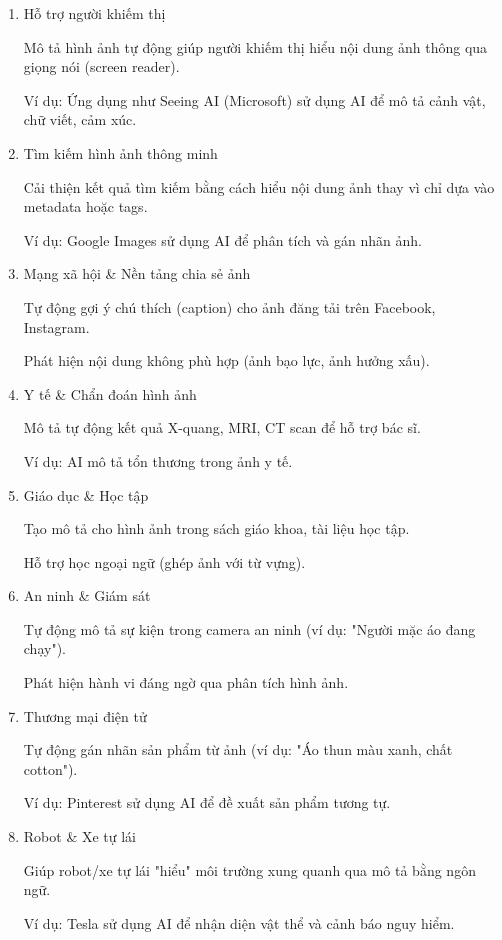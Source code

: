 \documentclass[../main.tex]{subfiles}
\begin{document}
\begin{enumerate}
    \item Hỗ trợ người khiếm thị
    
    Mô tả hình ảnh tự động giúp người khiếm thị hiểu nội dung ảnh thông qua giọng nói (screen reader).

    Ví dụ: Ứng dụng như Seeing AI (Microsoft) sử dụng AI để mô tả cảnh vật, chữ viết, cảm xúc.

    \item Tìm kiếm hình ảnh thông minh
    
    Cải thiện kết quả tìm kiếm bằng cách hiểu nội dung ảnh thay vì chỉ dựa vào metadata hoặc tags.

    Ví dụ: Google Images sử dụng AI để phân tích và gán nhãn ảnh.

    \item Mạng xã hội \& Nền tảng chia sẻ ảnh
    
    Tự động gợi ý chú thích (caption) cho ảnh đăng tải trên Facebook, Instagram.

    Phát hiện nội dung không phù hợp (ảnh bạo lực, ảnh hưởng xấu).

    \item Y tế \& Chẩn đoán hình ảnh
    
    Mô tả tự động kết quả X-quang, MRI, CT scan để hỗ trợ bác sĩ.

    Ví dụ: AI mô tả tổn thương trong ảnh y tế.

    \item Giáo dục \& Học tập
    
    Tạo mô tả cho hình ảnh trong sách giáo khoa, tài liệu học tập.

    Hỗ trợ học ngoại ngữ (ghép ảnh với từ vựng).

    \item An ninh \& Giám sát
    
    Tự động mô tả sự kiện trong camera an ninh (ví dụ: "Người mặc áo đang chạy").

    Phát hiện hành vi đáng ngờ qua phân tích hình ảnh.

    \item Thương mại điện tử
    
    Tự động gán nhãn sản phẩm từ ảnh (ví dụ: "Áo thun màu xanh, chất cotton").

    Ví dụ: Pinterest sử dụng AI để đề xuất sản phẩm tương tự.

    \item Robot \& Xe tự lái
    
    Giúp robot/xe tự lái "hiểu" môi trường xung quanh qua mô tả bằng ngôn ngữ.

    Ví dụ: Tesla sử dụng AI để nhận diện vật thể và cảnh báo nguy hiểm.
\end{enumerate}
\end{document}

